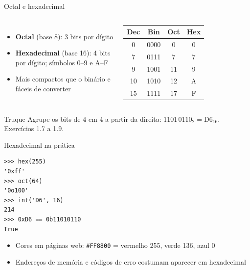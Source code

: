 \documentclass[aspectratio=169,10pt,t]{beamer}
\begin{document}
\begin{frame}{Octal e hexadecimal}
  \begin{columns}[T]
    \begin{itemize}
      \item \textbf{Octal} (base 8): 3 bits por dígito
      \item \textbf{Hexadecimal} (base 16): 4 bits por dígito; símbolos 0--9 e A--F
      \item Mais compactos que o binário e fáceis de converter
    \end{itemize}
    \centering\small
    \begin{tabular}{cccc}
      \toprule
      Dec & Bin & Oct & Hex\\
      \midrule
      0 & 0000 & 0 & 0\\
      7 & 0111 & 7 & 7\\
      9 & 1001 & 11 & 9\\
      10 & 1010 & 12 & A\\
      15 & 1111 & 17 & F\\
      \bottomrule
    \end{tabular}
  \end{columns}
  \vspace{1ex}
  \begin{exampleblock}{Truque}
    Agrupe os bits de 4 em 4 a partir da direita: \(1101\,0110_2 = \text{D6}_{16}\). Exercícios 1.7 a 1.9.
  \end{exampleblock}
\end{frame}

\begin{frame}[fragile]{Hexadecimal na prática}
\begin{lstlisting}
>>> hex(255)
'0xff'
>>> oct(64)
'0o100'
>>> int('D6', 16)
214
>>> 0xD6 == 0b11010110
True
\end{lstlisting}
  \begin{itemize}
    \item Cores em páginas web: \texttt{\#FF8800} = vermelho 255, verde 136, azul 0
    \item Endereços de memória e códigos de erro costumam aparecer em hexadecimal
  \end{itemize}
\end{frame}
\end{document}
